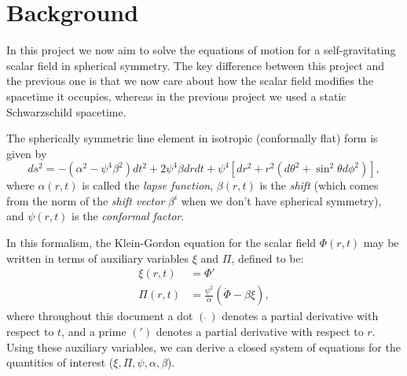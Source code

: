 \documentclass[12pt]{article}
\numberwithin{equation}{section}
\begin{document}
\section{Background}
In this project we now aim to solve the equations of motion for a self-gravitating scalar field in spherical symmetry.  The key difference between this project and the previous one is that we now care about how the scalar field modifies the spacetime it occupies, whereas in the previous project we used a static Schwarzschild spacetime.

The spherically symmetric line element in isotropic (conformally flat) form is given by
\begin{equation} \label{eq:line_element}
ds^2 = -(\alpha^2 - \psi^4 \beta^2) dt^2 + 2 \psi^4 \beta dr dt + \psi^4 [dr^2 + r^2 (d\theta^2 + \sin^2 \theta d\phi^2)],
\end{equation}
where $\alpha(r, t)$ is called the \textit{lapse function}, $\beta(r, t)$ is the \textit{shift} (which comes from the norm of the \textit{shift vector} $\beta^i$ when we don't have spherical symmetry), and $\psi(r, t)$ is the \textit{conformal factor}.

In this formalism, the Klein-Gordon equation for the scalar field $\Phi(r, t)$ may be written in terms of auxiliary variables $\xi$ and $\Pi$, defined to be:
\begin{align}
\xi(r, t) &= \Phi' \label{eq:xi_defn} \\
\Pi(r, t) &= \frac{\psi^2}{\alpha}(\dot{\Phi} - \beta \xi), \label{eq:Pi_defn} 
\end{align}
where throughout this document a dot $(\dot{~})$ denotes a partial derivative with respect to $t$, and a prime $(')$ denotes a partial derivative with respect to $r$.  Using these auxiliary variables, we can derive a closed system of equations for the quantities of interest ($\xi, \Pi, \psi, \alpha, \beta$).
\end{document}
